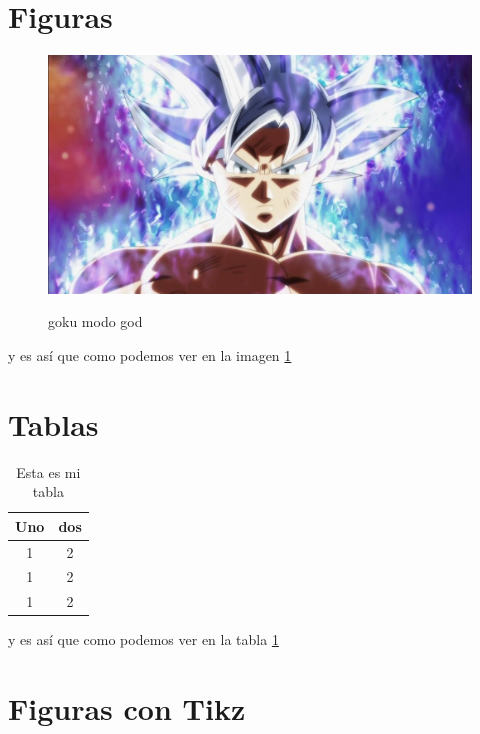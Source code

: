 \documentclass{article}
\begin{document}
\section{Figuras}
    \begin{figure}[H]
        \centering
        \caption{goku modo god}
        \includegraphics[width=\linewidth]{goku.jpg}
        \label{fig:fig1}
    \end{figure}
     y es así que como podemos ver en la imagen \ref{fig:fig1}

\section{Tablas}
    \begin{table}[H]
        \centering
        \caption{Esta es mi tabla}
            \begin{tabular}{cc}
                \hline
                    Uno & dos \\
                \hline
                    1   & 2 \\
                    1   & 2 \\
                    1   & 2 \\
                \hline
            \end{tabular}
        \label{tab:tab1}
    \end{table}
     y es así que como podemos ver en la tabla \ref{tab:tab1}

\section{Figuras con Tikz}
    \begin{center}
    \end{center}
\end{document}
